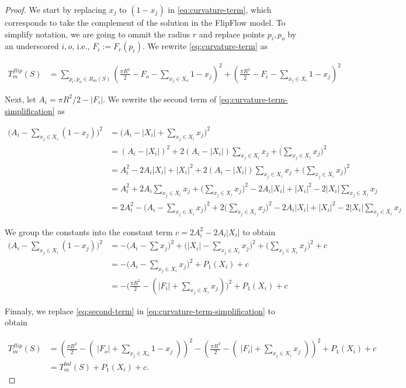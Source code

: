 \begin{proof}

We start by replacing $x_j$ to $(1-x_j)$ in \eqref{eq:curvature-term}, which corresponds to take the complement of the solution in the FlipFlow model. To simplify notation, we are going to ommit the radius $r$ and replace points $p_i,p_o$ by an underscored $i,o$, i.e., $F_i := F_r(p_i)$. We rewrite \eqref{eq:curvature-term} as

\begin{align}
T_{m}^{flip}(S) &= \sum_{ p_i,p_o \in R_m(S)}{ ( \frac{\pi R^2}{2} - F_o - \sum_{x_j \in X_o}{1-x_j})^2 + (\frac{\pi R^2}{2} - F_i - \sum_{x_j \in X_i}{1-x_j})^2 }
\label{eq:curvature-term-simplification}
\end{align}

Next, let $A_i = \pi R^2/2 - |F_i|$. We rewrite  the second term of \eqref{eq:curvature-term-simplification} as

\begin{align*}
	\Big(A_i - \sum_{x_j \in X_i}{ (1-x_j) } \Big)^2 &= \Big( A_i - |X_i| + \sum_{x_j \in X_i}{ x_j } \Big)^2 \\
	&= (A_i - |X_i|)^2 + 2(A_i - |X_i|)\sum_{x_j \in X_i}{x_j} + \Big( \sum_{x_j \in X_i}{x_j} \Big)^2\\	
	&= A_i^2 -2A_i|X_i| + |X_i|^2 + 2(A_i - |X_i|)\sum_{x_j \in X_i}{x_j} + \Big( \sum_{x_j \in X_i}{x_j} \Big)^2\\
	&= A_i^2 + 2A_i\sum_{x_j \in X_i}{x_j} + \Big( \sum_{x_j \in X_i}{x_j} \Big)^2 - 2A_i|X_i| + |X_i|^2 -2|X_i|\sum_{x_j \in X_i}{x_j} \\
	&= 2A_i^2 - \Big(A_i - \sum_{x_j \in X_i}{x_j}\Big)^2 + 2\Big( \sum_{x_j \in X_i}{x_j} \Big) ^2 - 2A_i|X_i| + |X_i|^2 - 2|X_i|\sum_{x_j \in X_i}{x_j}
\end{align*}

	We group the constants into the constant term $c=2A_i^2 - 2A_i|X_i|$	 to obtain
\begin{align}
		\Big(A_i - \sum_{x_j \in X_i}{ (1-x_j) }\Big)^2 &= - \Big(A_i - \sum_{}{x_j}\Big)^2 + \Big(|X_i| - \sum_{x_j \in X_i}{x_j}\Big)^2 + \Big(\sum_{x_j \in X_i}{x_j}\Big)^2 + c \nonumber \\
	&= - \Big(A_i - \sum_{x_j \in X_i}{x_j}\Big)^2 + P_1(X_i) + c \nonumber \\
	&= - \Big(\frac{\pi R^2}{2} - (|F_i| + \sum_{x_j \in X_i}{x_j}) \Big)^2 + P_1(X_i) + c \nonumber 	
	\label{eq:second-term}
\end{align}

Finnaly, we  replace \eqref{eq:second-term} in \eqref{eq:curvature-term-simplification} to obtain

\begin{align}
T_{m}^{flip}(S) &= ( \frac{\pi R^2}{2} - (\; |F_o| + \sum_{ x_j \in X_o}{1-x_j} \; ) )^2 -(\frac{\pi R^2}{2} - (\; |F_i| + \sum_{x_j \in X_i}{x_j}\;))^2  + P_1(X_i) + c \nonumber \\
&= T_{m}^{bal}(S) + P_1(X_i) + c.
\end{align}

\end{proof}

